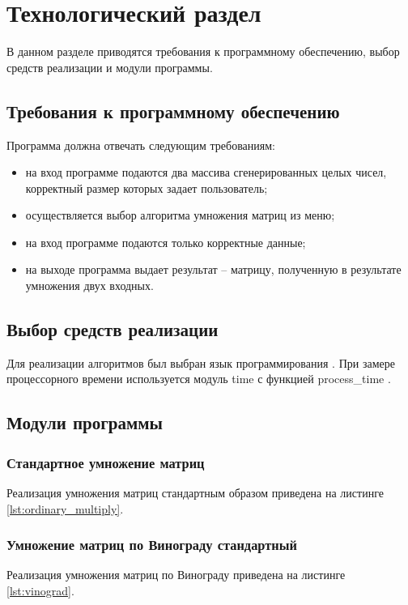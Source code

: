 \chapter{Технологический раздел}
В данном разделе приводятся требования к программному обеспечению, выбор средств реализации и модули программы.
\section{Требования к программному обеспечению}
Программа должна отвечать следующим требованиям:
\begin{itemize}
	\item на вход программе подаются два массива сгенерированных целых чисел, корректный размер которых задает пользователь;
	\item осуществляется выбор алгоритма умножения матриц из меню;
	\item на вход программе подаются только корректные данные;
	\item на выходе программа выдает результат -- матрицу, полученную в результате умножения двух входных.
\end{itemize}

\section{Выбор средств реализации}
Для реализации алгоритмов был выбран язык программирования . При замере процессорного времени используется модуль time с функцией process\_time \cite{process_time}.

\section{Модули программы}
\subsection{Стандартное умножение матриц}
Реализация умножения матриц стандартным образом приведена на листинге \ref{lst:ordinary_multiply}.

\subsection{Умножение матриц по Винограду стандартный}
Реализация умножения матриц по Винограду приведена на листинге \ref{lst:vinograd}.

